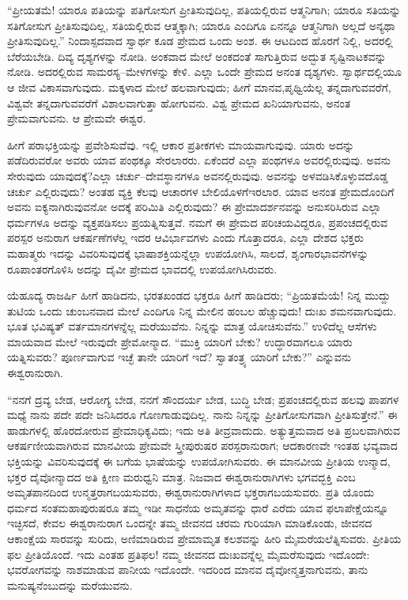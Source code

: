 \vskip 0.2cm

“ಪ್ರೀಯತಮೆ! ಯಾರೂ ಪತಿಯನ್ನು ಪತಿಗೋಸುಗ ಪ್ರೀತಿಸುವುದಿಲ್ಲ, ಪತಿಯಲ್ಲಿರುವ ಆತ್ಮನಿಗಾಗಿ; ಯಾರೂ ಸತಿಯನ್ನು ಸತಿಗೋಸುಗ ಪ್ರೀತಿಸುವುದಿಲ್ಲ, ಸತಿಯಲ್ಲಿರುವ ಆತ್ಮಕ್ಕಾಗಿ; ಯಾರೂ ಎಂದಿಗೂ ಏನನ್ನೂ ಆತ್ಮನಿಗಾಗಿ ಅಲ್ಲದೆ ಅನ್ಯಥಾ ಪ್ರೀತಿಸುವುದಿಲ್ಲ.” ನಿಂದಾಸ್ಪದವಾದ ಸ್ವಾರ್ಥ ಕೂಡ ಪ್ರೇಮದ ಒಂದು ಅಂಶ. ಈ ಆಟದಿಂದ ಹೊರಗೆ ನಿಲ್ಲಿ, ಅದರಲ್ಲಿ ಬೆರೆಯಬೇಡಿ. ದಿವ್ಯ ದೃಶ್ಯಗಳನ್ನು ನೋಡಿ. ಅಂಕವಾದ ಮೇಲೆ ಅಂಕದಂತೆ ಸಾಗುತ್ತಿರುವ ಅದ್ಭುತ ಸೃಷ್ಟಿನಾಟಕವನ್ನು ನೋಡಿ. ಅದರಲ್ಲಿರುವ ಸಾಮರಸ್ಯ–ಮೇಳಗಳನ್ನು ಕೇಳಿ. ಎಲ್ಲಾ ಒಂದೇ ಪ್ರೇಮದ ಅನಂತ ದೃಶ್ಯಗಳು. ಸ್ವಾರ್ಥದಲ್ಲಿಯೂ ಆ ಜೀವ ವಿಕಾಸವಾಗುವುದು. ಮಕ್ಕಳಾದ ಮೇಲೆ ಹಲವಾಗುವುದು; ಹೀಗೆ ಮಾನವ,\break ಪೃಥ್ವಿಯೆಲ್ಲ ತನ್ನದಾಗುವವರೆಗೆ, ವಿಶ್ವವೇ ತನ್ನದಾಗುವವರೆಗೆ ವಿಶಾಲವಾಗುತ್ತಾ ಹೋಗುವನು. ವಿಶ್ವ ಪ್ರೇಮದ ಖನಿಯಾಗುವನು, ಅನಂತ ಪ್ರೇಮವಾಗುವನು. ಆ ಪ್ರೇಮವೇ ಈಶ್ವರ.

\vskip 0.2cm

ಹೀಗೆ ಪರಾಭಕ್ತಿಯನ್ನು ಪ್ರವೇಶಿಸುವೆವು. ಇಲ್ಲಿ ಆಕಾರ ಪ್ರತೀಕಗಳು ಮಾಯವಾಗುವುವು. ಯಾರು ಅದನ್ನು ಪಡೆದಿರುವರೋ ಅವರು ಯಾವ ಪಂಥಕ್ಕೂ ಸೇರಲಾರರು. ಏಕೆಂದರೆ ಎಲ್ಲಾ ಪಂಥಗಳೂ ಅವರಲ್ಲಿರುವುವು. ಅವನು ಸೇರುವುದು ಯಾವುದಕ್ಕೆ?\break ಎಲ್ಲಾ ಚರ್ಚು–ದೇವಸ್ಥಾನಗಳೂ ಅವನಲ್ಲಿರುವುವು. ಅವನನ್ನು ಅಳವಡಿಸಿಕೊಳ್ಳುವ\break ದೊಡ್ಡ ಚರ್ಚು ಎಲ್ಲಿರುವುದು? ಅಂತಹ ವ್ಯಕ್ತಿ ಕೆಲವು ಆಚಾರಗಳ ಬೇಲಿಯೊಳಗೆ\break ಇರಲಾರ. ಯಾವ ಅನಂತ ಪ್ರೇಮದೊಂದಿಗೆ ಅವನು ಐಕ್ಯನಾಗಿರುವುವನೋ ಅದಕ್ಕೆ ಪರಿಮಿತಿ ಎಲ್ಲಿರುವುದು? ಈ ಪ್ರೇಮಾದರ್ಶನವನ್ನು ಅನುಸರಿಸಿರುವ ಎಲ್ಲಾ ಧರ್ಮಗಳೂ ಅದನ್ನು ವ್ಯಕ್ತಪಡಿಸಲು ಪ್ರಯತ್ನಿಸುತ್ತವೆ. ನಮಗೆ ಈ ಪ್ರೇಮದ ಪರಿಚಯವಿದ್ದರೂ, ಪ್ರಪಂಚದಲ್ಲಿರುವ ಪರಸ್ಪರ ಅನುರಾಗ ಆಕರ್ಷಣೆಗಳೆಲ್ಲ ಇದರ ಆವಿರ್ಭಾವಗಳು ಎಂದು ಗೊತ್ತಾದರೂ, ಎಲ್ಲಾ ದೇಶದ ಭಕ್ತರು ಮಹಾತ್ಮರು ಇದನ್ನು ವಿವರಿಸುವುದಕ್ಕೆ ಭಾಷಾಶಕ್ತಿಯನ್ನೆಲ್ಲಾ ಉಪಯೋಗಿಸಿ, ಸಾಲದೆ, ಶೃಂಗಾರಭಾವನೆಗಳನ್ನು ರೂಪಾಂತರಗೊಳಿಸಿ ಅದನ್ನು ದೈವೀ ಪ್ರೇಮದ ಭಾವದಲ್ಲಿ ಉಪಯೋಗಿಸಿರುವರು.

ಯೆಹೂದ್ಯ ರಾಜರ್ಷಿ ಹೀಗೆ ಹಾಡಿದನು, ಭರತಖಂಡದ ಭಕ್ತರೂ ಹೀಗೆ ಹಾಡಿದರು; “ಪ್ರಿಯತಮೆಯೆ! ನಿನ್ನ ಮುದ್ದು ತುಟಿಯ ಒಂದು ಚುಂಬನವಾದ ಮೇಲೆ ಎಂದಿಗೂ ನಿನ್ನ ಮೇಲಿನ ಹಂಬಲ ಹೆಚ್ಚುವುದು! ದುಃಖ ಶಮನವಾಗುವುದು. ಭೂತ ಭವಿಷ್ಯತ್​ ವರ್ತಮಾನಗಳನ್ನೆಲ್ಲ ಮರೆಯುವೆನು. ನಿನ್ನನ್ನು ಮಾತ್ರ ಯೋಚಿಸುವೆನು.” ಉಳಿದೆಲ್ಲ ಆಸೆಗಳು ಮಾಯವಾದ ಮೇಲೆ ಇರುವುದೇ ಪ್ರೇಮೋನ್ಮಾದ. “ಮುಕ್ತಿ ಯಾರಿಗೆ ಬೇಕು? ಉದ್ಧಾರ\-ವಾಗಲೂ ಯಾರು ಯತ್ನಿಸುವರು? ಪೂರ್ಣವಾಗುವ ಇಚ್ಛೆ ತಾನೇ ಯಾರಿಗೆ ಇದೆ? ಸ್ವಾತಂತ್ರ್ಯ ಯಾರಿಗೆ ಬೇಕು?” ಎನ್ನುವನು ಈಶ್ವರಾನುರಾಗಿ.

“ನನಗೆ ದ್ರವ್ಯ ಬೇಡ, ಆರೋಗ್ಯ ಬೇಡ, ನನಗೆ ಸೌಂದರ್ಯ ಬೇಡ, ಬುದ್ಧಿ ಬೇಡ; ಪ್ರಪಂಚದಲ್ಲಿರುವ ಹಲವು ಪಾಪಗಳ ಮಧ್ಯೆ ನಾನು ಪದೇ ಪದೇ ಜನಿಸಿದರೂ ಗೊಣಗಾಡುವುದಿಲ್ಲ. ನಾನು ನಿನ್ನನ್ನು ಪ್ರೀತಿಗೋಸುಗವಾಗಿ ಪ್ರೀತಿಸುತ್ತೇನೆ.” ಈ ಹಾಡುಗಳಲ್ಲಿ ಹೊರದೋರುವ ಪ್ರೇಮಾಧಿಕ್ಯವಿದು; ಇದು ಅತಿ ತೀವ್ರವಾದುದು. ಅತ್ಯುತ್ತಮವಾದ ಅತಿ ಪ್ರಬಲವಾಗಿರುವ ಆಕರ್ಷಣೀಯವಾಗಿರುವ ಮಾನವೀಯ ಪ್ರೇಮವೇ ಸ್ತ್ರೀಪುರುಷರ ಪರಸ್ಪರಾನುರಾಗ; ಆದಕಾರಣವೇ ಇಂತಹ ಭವ್ಯವಾದ ಭಕ್ತಿಯನ್ನು ವಿವರಿಸುವುದಕ್ಕೆ ಈ ಬಗೆಯ ಭಾಷೆಯನ್ನು ಉಪಯೋಗಿಸುವರು. ಈ ಮಾನವೀಯ ಪ್ರೀತಿಯ ಉನ್ಮಾದ, ಭಕ್ತರ ದೈವೋನ್ಮಾದದ ಅತಿ ಕ್ಷೀಣ ಮರುಧ್ವನಿ ಮಾತ್ರ. ನಿಜವಾದ ಈಶ್ವರಾನುರಾಗಿಗಳು ಭಗವದ್ಭಕ್ತಿ ಎಂಬ ಅಮೃತಪಾನದಿಂದ ಉನ್ಮತ್ತರಾಗಬಯಸುವರು, ಈಶ್ವರಾನುರಾಗಿಗಳಾದ ಭಕ್ತರಾಗಬಯಸುವರು. ಪ್ರತಿ ಯೊಂದು ಧರ್ಮದ ಸಂತಮಹಾಪುರುಷರೂ ತಮ್ಮ ಇಡೀ ಸಾಧನೆಯ ಅಮೃತವನ್ನು ಧಾರೆ ಎರೆದು ಯಾವ ಫಲಾಪೇಕ್ಷೆಯನ್ನೂ ಇಚ್ಛಿಸದೆ, ಕೇವಲ ಈಶ್ವರಾನುರಾಗ ಒಂದನ್ನೇ ತಮ್ಮ ಜೀವನದ ಚರಮ ಗುರಿಯಾಗಿ ಮಾಡಿಕೊಂಡು, ಜೀವನದ ಆಕಾಂಕ್ಷೆಯ ಸಾರವನ್ನು ಸುರಿದು, ಅಣಿಮಾಡಿರುವ ಪ್ರೇಮಾಮೃತ ಕಲಶವನ್ನು ಹೀರಿ ಮೈಮರೆಯಲೆತ್ನಿಸುವರು. ಪ್ರೀತಿಯ ಫಲ ಪ್ರೀತಿಯೊಂದೆ. ಇದು ಎಂತಹ ಪ್ರತಿಫಲ! ನಮ್ಮ ಜೀವನದ ದುಃಖವನ್ನೆಲ್ಲ ಮೈಮರೆಸುವುದು ಇದೊಂದೇ: ಭವರೋಗವನ್ನು ನಾಶಮಾಡುವ ಪಾನೀಯ ಇದೊಂದೇ. ಇದರಿಂದ ಮಾನವ ದೈವೋನ್ಮತ್ತನಾಗುವನು, ತಾನು ಮನುಷ್ಯನೆಂಬುದನ್ನು ಮರೆಯುವನು.

